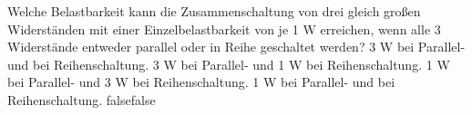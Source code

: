     {Welche Belastbarkeit kann die Zusammenschaltung von drei gleich großen Widerständen mit einer Einzelbelastbarkeit von je 1 W erreichen, wenn alle 3 Widerstände entweder parallel oder in Reihe geschaltet werden?}
    {3 W bei Parallel- und bei Reihenschaltung.}
    {3 W bei Parallel- und 1 W bei Reihenschaltung.}
    {1 W bei Parallel- und 3 W bei Reihenschaltung.}
    {1 W bei Parallel- und bei Reihenschaltung.}
    {false}{false}